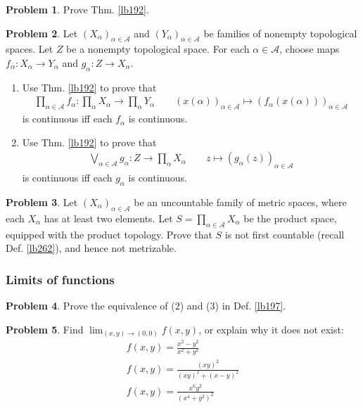 \documentclass[12pt,b5paper,notitlepage]{article}
\theoremstyle{definition}
\newtheorem{prob}{\color{red}Problem}[section]
\theoremstyle{plain}
\newcommand{\scr}{\mathscr}
\newcommand{\dps}{\displaystyle}
\numberwithin{equation}{section}
\begin{document}
\begin{prob}
Prove Thm. \ref{lb192}.
\end{prob}


\begin{prob}\label{lb258}
Let $(X_\alpha)_{\alpha\in\scr A}$ and $(Y_\alpha)_{\alpha\in\scr A}$ be families of nonempty topological spaces. Let $Z$ be a nonempty topological space. For each $\alpha\in\scr A$, choose maps $f_\alpha:X_\alpha\rightarrow Y_\alpha$ and $g_\alpha:Z\rightarrow X_\alpha$. 
\begin{enumerate}
\item Use Thm. \ref{lb192} to prove that 
\begin{align}
\prod_{\alpha\in\scr A}f_\alpha:\prod_\alpha X_\alpha\rightarrow\prod_\alpha Y_\alpha\qquad (x(\alpha))_{\alpha\in\scr A}\mapsto (f_\alpha(x(\alpha)))_{\alpha\in\scr A}
\end{align}
is continuous iff each $f_\alpha$ is continuous.
\item Use Thm. \ref{lb192} to prove that
\begin{align}
\bigvee_{\alpha\in\scr A}g_\alpha:Z\rightarrow \prod_\alpha X_\alpha \qquad z\mapsto (g_\alpha(z))_{\alpha\in\scr A}
\end{align}
is continuous iff each $g_\alpha$ is continuous.
\end{enumerate}
\end{prob}







\begin{prob}\label{lb203}
Let $(X_\alpha)_{\alpha\in\scr A}$ be an uncountable family of metric spaces, where each $X_\alpha$ has at least two elements. Let $S=\prod_{\alpha\in\scr A}X_\alpha$ be the product space, equipped with the product topology. Prove that $S$ is not first countable (recall Def. \ref{lb262}), and hence not metrizable.
\end{prob}

\subsubsection{Limits of functions}

\begin{prob}
Prove the equivalence of (2) and (3) in Def. \ref{lb197}.
\end{prob}


\begin{prob}
Find $\dps\lim_{(x,y)\rightarrow(0,0)}f(x,y)$, or explain why it does not exist:
\begin{gather*}
f(x,y)=\frac{x^2-y^2}{x^2+y^2}\\
f(x,y)=\frac{(xy)^2}{(xy)^2+(x-y)^2}\\
f(x,y)=\frac{x^6y^2}{(x^4+y^2)^2}
\end{gather*}
\end{prob}
\end{document}
